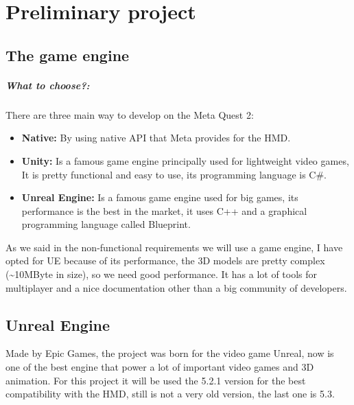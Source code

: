 
\chapter{Preliminary project}

\section{The game engine}

\paragraph{What to choose?:} 
There are three main way to develop on the Meta Quest 2:

\begin{itemize}
  \item \textbf{Native:} By using native \ac{API} that Meta provides for the \ac{HMD}.
  \item \textbf{Unity:} Is a famous game engine principally used for lightweight video games, It is pretty functional and easy to use, its programming language is C\#.
  \item \textbf{Unreal Engine:} Is a famous game engine used for big games, its performance is the best in the market, it uses C++ and a graphical programming language called Blueprint.
\end{itemize}
\noindent
As we said in the non-functional requirements we will use a game engine, I have opted for \ac{UE} because of its performance, the 3D models are pretty complex (\textasciitilde10MByte in size),
so we need good performance.
It has a lot of tools for multiplayer and a nice documentation other than a big community of developers.

\section{Unreal Engine}
\noindent
Made by Epic Games, the project was born for the video game Unreal, now is one of the best engine that power a lot of important video games and 3D animation.
For this project it will be used the 5.2.1 version for the best compatibility with the \ac{HMD}, still is not a very old version, the last one is 5.3. 

